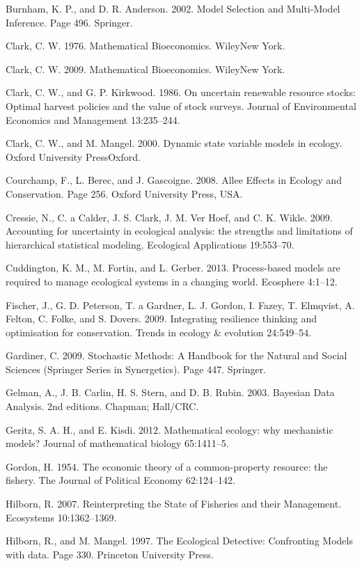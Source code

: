 \documentclass[author-year, 12pt,review]{components/elsarticle} %
\begin{document}
Burnham, K. P., and D. R. Anderson. 2002. Model Selection and
Multi-Model Inference. Page 496. Springer.

Clark, C. W. 1976. Mathematical Bioeconomics. WileyNew York.

Clark, C. W. 2009. Mathematical Bioeconomics. WileyNew York.

Clark, C. W., and G. P. Kirkwood. 1986. On uncertain renewable resource
stocks: Optimal harvest policies and the value of stock surveys. Journal
of Environmental Economics and Management 13:235--244.

Clark, C. W., and M. Mangel. 2000. Dynamic state variable models in
ecology. Oxford University PressOxford.

Courchamp, F., L. Berec, and J. Gascoigne. 2008. Allee Effects in
Ecology and Conservation. Page 256. Oxford University Press, USA.

Cressie, N., C. a Calder, J. S. Clark, J. M. {Ver Hoef}, and C. K.
Wikle. 2009. Accounting for uncertainty in ecological analysis: the
strengths and limitations of hierarchical statistical modeling.
Ecological Applications 19:553--70.

Cuddington, K. M., M. Fortin, and L. Gerber. 2013. Process-based models
are required to manage ecological systems in a changing world. Ecosphere
4:1--12.

Fischer, J., G. D. Peterson, T. a Gardner, L. J. Gordon, I. Fazey, T.
Elmqvist, A. Felton, C. Folke, and S. Dovers. 2009. Integrating
resilience thinking and optimisation for conservation. Trends in ecology
\& evolution 24:549--54.

Gardiner, C. 2009. Stochastic Methods: A Handbook for the Natural and
Social Sciences (Springer Series in Synergetics). Page 447. Springer.

Gelman, A., J. B. Carlin, H. S. Stern, and D. B. Rubin. 2003. Bayesian
Data Analysis. 2nd editions. Chapman; Hall/CRC.

Geritz, S. A. H., and E. Kisdi. 2012. Mathematical ecology: why
mechanistic models? Journal of mathematical biology 65:1411--5.

Gordon, H. 1954. The economic theory of a common-property resource: the
fishery. The Journal of Political Economy 62:124--142.

Hilborn, R. 2007. Reinterpreting the State of Fisheries and their
Management. Ecosystems 10:1362--1369.

Hilborn, R., and M. Mangel. 1997. The Ecological Detective: Confronting
Models with data. Page 330. Princeton University Press.
\end{document}
